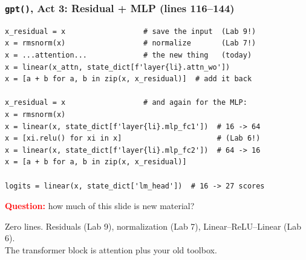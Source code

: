 \begin{frame}[fragile]
    \frametitle{\texttt{gpt()}, Act 3: Residual + MLP (lines 116--144)}

\begin{lstlisting}
x_residual = x                  # save the input  (Lab 9!)
x = rmsnorm(x)                  # normalize       (Lab 7!)
x = ...attention...             # the new thing   (today)
x = linear(x_attn, state_dict[f'layer{li}.attn_wo'])
x = [a + b for a, b in zip(x, x_residual)]  # add it back

x_residual = x                  # and again for the MLP:
x = rmsnorm(x)
x = linear(x, state_dict[f'layer{li}.mlp_fc1'])  # 16 -> 64
x = [xi.relu() for xi in x]                      # (Lab 6!)
x = linear(x, state_dict[f'layer{li}.mlp_fc2'])  # 64 -> 16
x = [a + b for a, b in zip(x, x_residual)]

logits = linear(x, state_dict['lm_head'])  # 16 -> 27 scores
\end{lstlisting}

    \pause

    \textcolor{red}{\textbf{Question:}} how much of this slide is new material?

    \pause

    \alert{Zero lines.} Residuals (Lab 9), normalization (Lab 7), Linear--ReLU--Linear (Lab 6).\\
    The transformer block is attention \alert{plus your old toolbox}.
\end{frame}

